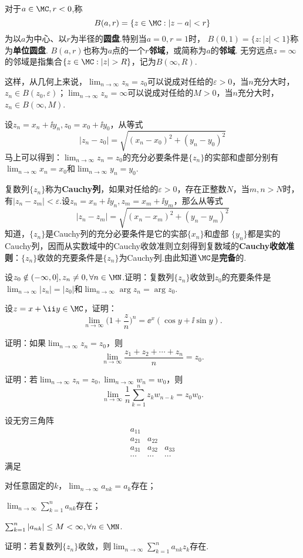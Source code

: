 对于$a\in\MC,r<0$,称
\[B(a,r)=\{z\in\MC:|z-a|<r\}\]
为以$a$为中心、以$r$为半径的\textbf{圆盘}.特别当$a=0,r=1$时， $B(0,1)=\{z:|z|<1\}$称为\textbf{单位圆盘}. $B(a,r)$也称为$a$点的一个\textbf{$r$邻域}，或简称为$a$的\textbf{邻域}. 无穷远点$z=\infty$的邻域是指集合$\{z\in\MC:|z|>R\}$，记为$B(\infty,R)$.

这样，从几何上来说，$\lim_{n\to\infty}z_n=z_0$可以说成对任给的$\varepsilon>0$，当$n$充分大时，$z_n\in B(z_0,\varepsilon)$；$\lim_{n\to\infty}z_n=\infty$可以说成对任给的$M>0$，当$n$充分大时，$z_n\in B(\infty,M)$.

设$z_n=x_n+\ii y_n,z_0=x_0+\ii y_0$，从等式
\[|z_n-z_0|=\sqrt{(x_n-x_0)^2+(y_n-y_0)^2}\]
马上可以得到：$\lim_{n\to\infty}z_n=z_0$的充分必要条件是$\{z_n\}$的实部和虚部分别有$\lim_{n\to\infty}x_n=x_0$和$\lim_{n\to\infty}y_n=y_0$.

复数列$\{z_n\}$称为\textbf{Cauchy列}，如果对任给的$\varepsilon>0$，存在正整数$N$，当$m,n>N$时，有$|z_n-z_m|<\varepsilon$.设$z_n=x_n+\ii y_n,z_m=x_m+\ii y_m$，那么从等式
\[|z_n-z_m|=\sqrt{(x_n-x_m)^2+(y_n-y_m)^2}\]
知道，$\{z_n\}$是Cauchy列的充分必要条件是它的实部$\{x_n\}$和虚部
$\{y_n\}$都是实的Cauchy列，因而从实数域中的Cauchy收敛准则立刻得到复数域的\textbf{Cauchy收敛准则}：$\{z_n\}$收敛的充要条件是$\{z_n\}$为Cauchy列.由此知道$\MC$是\textbf{完备}的.

\begin{xiti}
  \item 设$z_0\notin(-\infty,0],z_n\ne0,\forall n\in\MN$.证明：复数列$\{z_n\}$收敛到$z_0$的充要条件是$\lim_{n\to\infty}|z_n|=|z_0|$和$\lim_{n\to\infty}\arg z_n=\arg z_0$.
  \item 设$z=x+\ii y\in\MC$，证明：
     \[\lim_{n\to\infty}\bigg(1+\frac zn\bigg)^n=\ee^x(\cos y+\ii\sin y).\]
  \item 证明：如果$\lim_{n\to\infty}z_n=z_0$，则
     \[\lim_{n\to\infty}\frac{z_1+z_2+\cdots+z_n}n=z_0.\]
  \item 证明：若$\lim_{n\to\infty}z_n=z_0,\lim_{n\to\infty}w_n=w_0$，则
     \[\lim_{n\to\infty}\frac1n\sum_{k=1}^nz_kw_{n-k}=z_0w_0.\]
  \item 设无穷三角阵
     \[\begin{matrix}
       a_{11}&\\
       a_{21}&a_{22}\\
       a_{31}&a_{32}&a_{33}\\
       \cdots&\cdots&\cdots
     \end{matrix}\]
  满足
  \begin{enuma}
    \item 对任意固定的$k$，$\lim_{n\to\infty}a_{nk}=a_k$存在；
    \item $\lim_{n\to\infty}\sum_{k=1}^na_{nk}$存在；
    \item $\sum_{k=1}^n|a_{nk}|\le M<\infty,\forall n\in \MN$.
  \end{enuma}
  证明：若复数列$\{z_n\}$收敛，则$\lim_{n\to\infty}\sum_{k=1}^na_{nk}z_k$存在.
\end{xiti}

